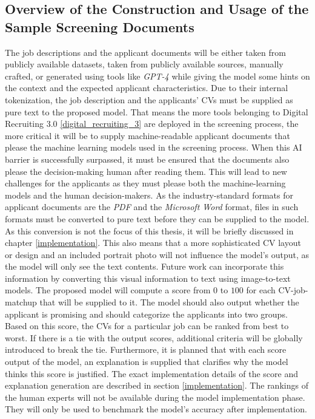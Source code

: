 \documentclass[draft,final]{thesisclass} %
\begin{document}
\subsection{Overview of the Construction and Usage of the Sample Screening Documents}
The job descriptions and the applicant documents will be either taken from publicly available datasets, taken from publicly available sources, manually crafted, or generated using tools like \textit{GPT-4} \parencite{gpt4} while giving the model some hints on the context and the expected applicant characteristics.
Due to their internal tokenization, the job description and the applicants' \acs{CV}s must be supplied as pure text to the proposed model.
That means the more tools belonging to Digital Recruiting 3.0 \ref{digital_recruiting_3} are deployed in the screening process, the more critical it will be to supply machine-readable applicant documents that please the machine learning models used in the screening process.
When this \acs{AI} barrier is successfully surpassed, it must be ensured that the documents also please the decision-making human after reading them.
This will lead to new challenges for the applicants as they must please both the machine-learning models and the human decision-makers.
As the industry-standard formats for applicant documents are the \textit{PDF} and the \textit{Microsoft Word} format, files in such formats must be converted to pure text before they can be supplied to the model.
As this conversion is not the focus of this thesis, it will be briefly discussed in chapter \ref{implementation}.
This also means that a more sophisticated \acs{CV} layout or design and an included portrait photo will not influence the model's output, as the model will only see the text contents.
Future work can incorporate this information by converting this visual information to text using image-to-text models.
The proposed model will compute a score from $0$ to $100$ for each \acs{CV}-job-matchup that will be supplied to it.
The model should also output whether the applicant is promising and should categorize the applicants into two groups.
Based on this score, the \acs{CV}s for a particular job can be ranked from best to worst.
If there is a tie with the output scores, additional criteria will be globally introduced to break the tie.
Furthermore, it is planned that with each score output of the model, an explanation is supplied that clarifies why the model thinks this score is justified.
The exact implementation details of the score and explanation generation are described in section \ref{implementation}.
The rankings of the human experts will not be available during the model implementation phase. They will only be used to benchmark the model's accuracy after implementation.
\end{document}
